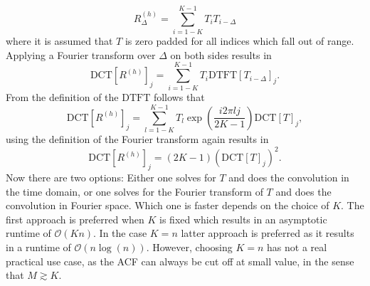 \documentclass[18pt,a4paper]{extarticle}
\begin{document}
\begin{equation}
R^{(h)}_\Delta = \sum_{i=1-K}^{K-1} T_{i} T_{i - \Delta}
\end{equation}
where it is assumed that $T$ is zero padded for all indices which fall out of range.
Applying a Fourier transform over $\Delta$ on both sides results in
\begin{equation}
\mathrm{DCT}[R^{(h)}]_j = \sum_{i=1-K}^{K-1} T_{i}\mathrm{DTFT}[T_{i - \Delta}]_j.
\end{equation}
From the definition of the $\mathrm{DTFT}$ follows that
\begin{equation}
\mathrm{DCT}[R^{(h)}]_j = \sum_{l=1-K}^{K-1} T_{l}\exp\left(\frac{i2\pi lj}{2K-1} \right) \mathrm{DCT}[T]_j,
\end{equation}
using the definition of the Fourier transform again results in
\begin{equation}
\mathrm{DCT}[R^{(h)}]_j = (2K - 1)\left( \mathrm{DCT}[T]_j \right)^2.
\end{equation}
Now there are two options: Either one solves for $T$ and does the convolution in the time domain, or one solves for the Fourier transform of $T$ and does the convolution in Fourier space.
Which one is faster depends on the choice of $K$.
The first approach is preferred when $K$ is fixed which results in an asymptotic runtime of $\mathcal{O}(Kn)$.
In the case $K=n$ latter approach is preferred as it results in a runtime of $\mathcal{O}(n\log(n))$.
However, choosing $K=n$ has not a real practical use case, as the ACF can always be cut off at small value, in the sense that $M \gtrsim K$.
\end{document}
